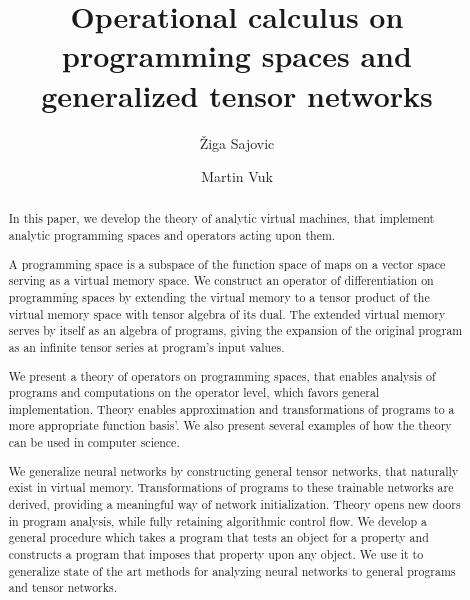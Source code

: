 \documentclass[smallcondensed]{svjour3}
\date{}
\begin{document}
\title{Operational calculus on programming spaces and generalized tensor networks}
\author{Žiga Sajovic \and Martin Vuk}
\maketitle
\begin{abstract}
In this paper, we develop the theory of analytic virtual machines, that
implement analytic programming spaces and operators acting upon them.

A programming space is a subspace of the function space of maps on a vector
space serving as a virtual memory space. We construct an operator of
differentiation on programming spaces by extending the virtual memory to a
tensor product of the virtual memory space with tensor algebra 
of its dual. The extended virtual memory serves by itself as an algebra of 
programs, giving the expansion of the original program as an infinite tensor
series at program's input values.  

We present a theory of operators on programming spaces, that enables analysis of programs
and computations on the operator level, which favors general implementation. Theory enables
approximation and transformations of programs to a more appropriate function basis'. We
also present several examples of how the theory can be used in computer science.

We generalize neural networks by constructing general tensor networks, that naturally exist in virtual memory. Transformations of programs to these trainable networks are derived, providing a meaningful way of network initialization.
Theory opens new doors in program analysis, while fully retaining algorithmic control flow. We develop a general
procedure which takes a program that tests an object for a property and
constructs a program that imposes that property upon any object. 
We use it to generalize state of the art methods for analyzing neural networks to general programs and tensor networks.

\end{abstract}
\end{document}
